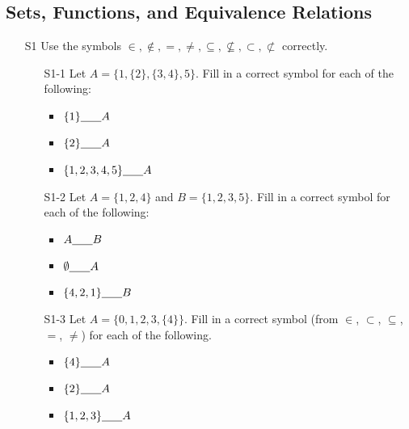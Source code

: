 \documentclass[11pt]{article}
\begin{document}
\subsection*{Sets, Functions, and Equivalence Relations}
\begin{itemize}
\item[S1] Use the symbols $\in, \notin, =,\neq,\subseteq,\not\subseteq,\subset,\not\subset$ correctly.
	\begin{enumerate}
	\item[S1-1] Let $A = \{ 1,\{2\}, \{3,4\}, 5\}$.  Fill in a correct symbol for each of the following:
		\begin{itemize}
		\item $\{1\} \underline{\hspace{.25in}} A$
		\item $\{2\} \underline{\hspace{.25in}} A$
		\item $\{1,2,3,4,5\} \underline{\hspace{.25in}}A$
		\end{itemize}
	\item[S1-2] Let $A = \{1,2,4\}$ and $B = \{1,2,3,5\}$.  Fill in a correct symbol for each of the following:
		\begin{itemize}
		\item $A\underline{\hspace{.25in}} B$
		\item $\emptyset \underline{\hspace{.25in}} A$
		\item $\{4,2,1\} \underline{\hspace{.25in}} B$
		\end{itemize}
	\item[S1-3]  Let $A = \{0,1,2,3,\{4\}\}$.  Fill in a correct symbol   (from $\in$, $\subset$, $\subseteq$, $=$, $\neq$) for each of the following.
		\begin{itemize}
		\item $\{4\} \underline{\hspace{.25in}} A$
		\item $\{2\} \underline{\hspace{.25in}} A$
		\item $\{1,2,3\} \underline{\hspace{.25in}}A$
		\end{itemize}
	\end{enumerate}
	
\newpage


\end{itemize}
\end{document}
